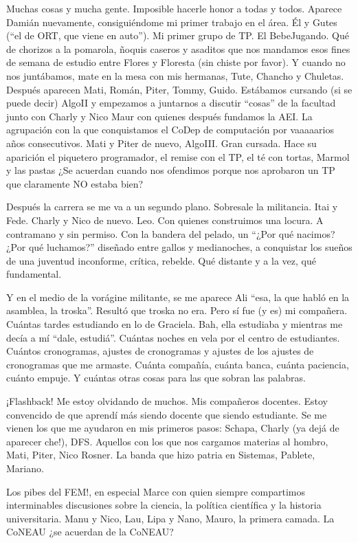 Muchas cosas y mucha gente. Imposible hacerle honor a todas y todos. Aparece Damián nuevamente, consiguiéndome mi primer trabajo en el área. Él y Gutes (``el de ORT, que viene en auto''). Mi primer grupo de TP. El BebeJugando. Qué de chorizos a la pomarola, ñoquis caseros y asaditos que nos mandamos esos fines de semana de estudio entre Flores y Floresta (sin chiste por favor). Y cuando no nos juntábamos, mate en la mesa con mis hermanas, Tute, Chancho y Chuletas. Después aparecen Mati, Román, Piter, Tommy, Guido. Estábamos cursando (si se puede decir) AlgoII y empezamos a juntarnos a discutir ``cosas'' de la facultad junto con Charly y Nico Maur con quienes después fundamos la AEI. La agrupación con la que conquistamos el CoDep de computación por vaaaaarios años consecutivos. Mati y Piter de nuevo, AlgoIII. Gran cursada. Hace su aparición el piquetero programador, el remise con el TP, el té con tortas, Marmol y las pastas ¿Se acuerdan cuando nos ofendimos porque nos aprobaron un TP que claramente NO estaba bien?

Después la carrera se me va a un segundo plano. Sobresale la militancia. Itai y Fede. Charly y Nico de nuevo. Leo. Con quienes construimos una locura. A contramano y sin permiso. Con la bandera del pelado, un ``¿Por qué nacimos?¿Por qué luchamos?'' diseñado entre gallos y medianoches, a conquistar los sueños de una juventud inconforme, crítica, rebelde. Qué distante y a la vez, qué fundamental.

Y en el medio de la vorágine militante, se me aparece Ali ``esa, la que habló en la asamblea, la troska''. Resultó que troska no era. Pero sí fue (y es) mi compañera. Cuántas tardes estudiando en lo de Graciela. Bah, ella estudiaba y mientras me decía a mí ``dale, estudiá''. Cuántas noches en vela por el centro de estudiantes. Cuántos cronogramas, ajustes de cronogramas y ajustes de los ajustes de cronogramas que me armaste. Cuánta compañía, cuánta banca, cuánta paciencia, cuánto empuje. Y cuántas otras cosas para las que sobran las palabras.

¡Flashback! Me estoy olvidando de muchos. Mis compañeros docentes. Estoy convencido de que aprendí más siendo docente que siendo estudiante. Se me vienen los que me ayudaron en mis primeros pasos: Schapa, Charly (ya dejá de aparecer che!), DFS. Aquellos con los que nos cargamos materias al hombro, Mati, Piter, Nico Rosner. La banda que hizo patria en Sistemas, Pablete, Mariano.

Los pibes del FEM!, en especial Marce con quien siempre compartimos interminables discusiones sobre la ciencia, la política científica y la historia universitaria. Manu y Nico, Lau, Lipa y Nano, Mauro, la primera camada. La CoNEAU ¿se acuerdan de la CoNEAU?

